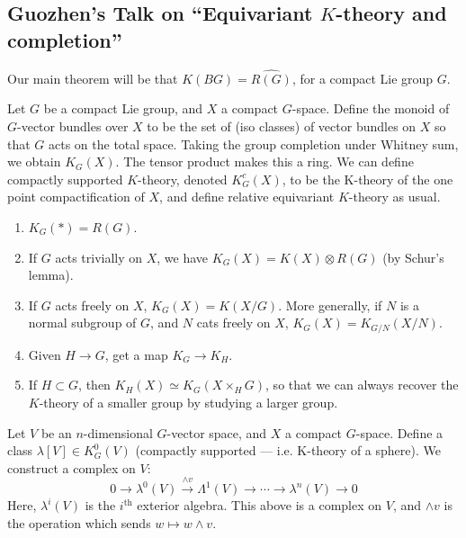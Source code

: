 \documentclass[11pt]{article}
\newcommand{\KanSemResponse}[1]
{
\thispagestyle{fancy}
\section{#1}
}
\begin{document}
\begin{GuozhenEqKthy}
\KanSemResponse
{Guozhen's Talk on ``Equivariant $K$-theory and completion''}
Our main theorem will be that $K(BG)=\widehat{R(G)}$, for a compact Lie group $G$.

\begin{defn*}Let $G$ be a compact Lie group, and $X$ a compact $G$-space. Define the monoid of $G$-vector bundles over $X$ to be the set of (iso classes) of vector bundles on $X$ so that $G$ acts on the total space. Taking the group completion under Whitney sum, we obtain $K_G(X)$. The tensor product makes this a ring. We can define compactly supported $K$-theory, denoted $K^c_G(X)$, to be the K-theory of the one point compactification of $X$, and define relative equivariant $K$-theory as usual.
\end{defn*}
\begin{enumerate}\squishlist
\item $K_G(*)=R(G)$. 
\item If $G$ acts trivially on $X$, we have $K_G(X)=K(X)\otimes R(G)$ (by Schur's lemma).
\item If $G$ acts freely on $X$, $K_G(X)=K(X/G)$. More generally, if $N$ is a normal subgroup of $G$, and $N$ cats freely on $X$, $K_G(X)=K_{G/N}(X/N)$.
\item Given $H\to G$, get a map $K_G\to K_H$.
\item If $H\subset G$, then $K_H(X)\simeq K_G(X\times_H G)$, so that we can always recover the $K$-theory of a smaller group by studying a larger group.
\end{enumerate}
Let $V$ be an $n$-dimensional $G$-vector space, and $X$ a compact $G$-space. Define a class $\lambda[V]\in K^0_G(V)$ (compactly supported --- i.e. K-theory of a sphere). We construct a complex on $V$:
\[0\to\lambda^0(V)\overset{\wedge v}{\to}\Lambda^1(V)\to\cdots\to \lambda^n(V)\to0\]
Here, $\lambda^i(V)$ is the $i^\text{th}$ exterior algebra. This above is a complex on $V$, and $\wedge v$ is the operation which sends $w\mapsto w\wedge v$.


\end{GuozhenEqKthy}
\end{document}
